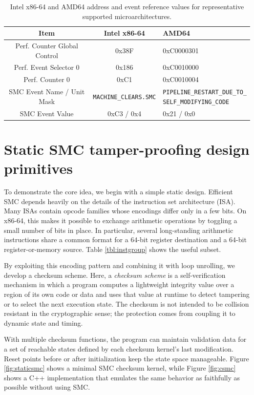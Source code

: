 \documentclass[11pt]{article}
\begin{document}
\begin{table}[t]
\centering
\small
\begin{tabular}{|c|c|p{4.3cm}|}
\hline
\textbf{Item} & \textbf{Intel x86-64} & \textbf{AMD64} \\ \hline
Perf. Counter Global Control & 0x38F & 0xC0000301 \\ \hline
Perf. Event Selector 0 & 0x186 & 0xC0010000 \\ \hline
Perf. Counter 0 & 0xC1 & 0xC0010004 \\ \hline
SMC Event Name / Unit Mask & \texttt{MACHINE\_CLEARS.SMC} & \parbox[t]{4.3cm}{\raggedright\scriptsize\texttt{PIPELINE\_RESTART\_DUE\_TO\_\\SELF\_MODIFYING\_CODE}} \\ \hline
SMC Event Value & 0xC3 / 0x4 & 0x21 / 0x0 \\ \hline
\end{tabular}
\caption{Intel x86-64 and AMD64 address and event reference values for representative supported microarchitectures.}
\label{tbl:smcx8664}
\end{table}

\section{Static SMC tamper-proofing design primitives}\label{sec:static-primitives}

To demonstrate the core idea, we begin with a simple static design.  Efficient
SMC depends heavily on the details of the instruction set architecture (ISA).
Many ISAs contain opcode families whose encodings differ only in a few bits.
On x86-64, this makes it possible to exchange arithmetic operations by toggling a
small number of bits in place.  In particular, several long-standing arithmetic
instructions share a common format for a 64-bit register destination and a 64-bit
register-or-memory source.  Table \ref{tbl:instgroup} shows the useful subset.

By exploiting this encoding pattern and combining it with loop unrolling, we
develop a checksum scheme.  Here, a \emph{checksum scheme} is a self-verification
mechanism in which a program computes a lightweight integrity value over a region
of its own code or data and uses that value at runtime to detect tampering or to
select the next execution state.  The checksum is not intended to be collision
resistant in the cryptographic sense; the protection comes from coupling it to
dynamic state and timing.

With multiple checksum functions, the program can maintain validation data for a
set of reachable states defined by each checksum kernel's last modification.
Reset points before or after initialization keep the state space manageable.
Figure \ref{fig:staticsmc} shows a minimal SMC checksum kernel, while Figure
\ref{fig:csmc} shows a C++ implementation that emulates the same behavior as
faithfully as possible without using SMC.
\end{document}
